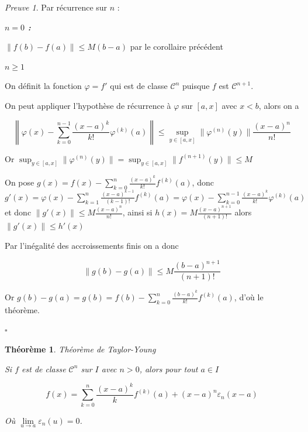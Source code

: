 \documentclass[]{article}
\newtheorem{mythm}{Théorème}
\theoremstyle{remark}
\newtheorem{myproof}{Preuve}
\theoremstyle{definition}
\newcommand{\cqfd}{
	\hfill$\square$
}
\newenvironment{proofpart}[1]{
	\leavevmode
	
	\noindent
	{\textit{\textbf{\boldmath #1}}}
	
}{
	\checkmark
}
\begin{document}
\begin{myproof}
	Par récurrence sur $n$ :
	
	\begin{proofpart}{$n = 0$ :}
		$\|f(b) - f(a)\| \leqslant M (b - a)$ par le corollaire précédent
	\end{proofpart}
	
	\begin{proofpart}{$ n \geqslant 1$}
		On définit la fonction $\varphi = f'$ qui est de classe $\mathcal{C}^n$ puisque $f$ est $\mathcal{C}^{n+1}$.
		
		On peut appliquer l'hypothèse de récurrence à $\varphi$ sur $[a, x]$ avec $x < b$, alors on a
		
		$$\left\|\varphi(x) - \sum_{k = 0}^{n - 1} \frac{(x - a)^k}{k!} \varphi^{(k)}(a)\right\| \leqslant \sup_{y \in [a, x]} \|\varphi^{(n)}(y)\| \frac{(x-a)^n}{n!}$$
		
		Or $\displaystyle \sup_{y \in [a, x]} \|\varphi^{(n)}(y)\| = \sup_{y \in [a, x]} \|f^{(n+1)}(y)\| \leqslant M$
		
		On pose $g(x) = f(x) - \sum_{k = 0}^{n} \frac{(x-a)^k}{k!}f^{(k)}(a)$, donc $g'(x) = \varphi(x) - \sum_{k = 1}^{n} \frac{(x-a)^{k-1}}{(k-1)!}f^{(k)}(a) = \varphi(x) - \sum_{k = 0}^{n-1} \frac{(x-a)^k}{k!}\varphi^{(k)}(a)$ et donc $\|g'(x)\| \leqslant M \frac{(x-a)^n}{n!}$, ainsi si $h(x)= M \frac{(x-a)^{n+1}}{(n+1)!}$ alors $\|g'(x)\| \leqslant h'(x)$
		
		Par l'inégalité des accroissements finis on a donc
		
		$$\|g(b) - g(a)\| \leqslant M \frac{(b-a)^{n+1}}{(n+1)!}$$
		
		Or $g(b) - g(a) = g(b) = f(b) - \sum_{k= 0}^{n} \frac{(b-a)^k}{k!} f^{(k)}(a)$, d'où le théorème.		
	\end{proofpart}
	
	\cqfd
\end{myproof}

\begin{mythm}
	Théorème de Taylor-Young
	
	Si $f$ est de classe $\mathcal{C}^n$ sur $I$ avec $n > 0$, alors pour tout $a \in I$
	
	$$f(x) = \sum_{k = 0}^{n} \frac{(x-a)^k}{k} f^{(k)}(a) + (x-a)^n \varepsilon_n(x- a)$$
	
	Où $\lim\limits_{u \to a} \varepsilon_n(u) = 0$.
\end{mythm}
\end{document}
